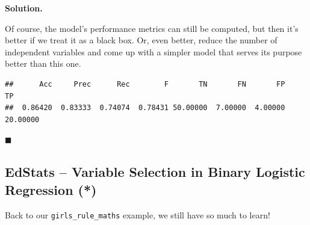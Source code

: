 \documentclass[10pt,b5paper,krantz1]{krantz}
\newenvironment{Shaded}{\begin{snugshade}}{\end{snugshade}}
\newcommand{\DataTypeTok}[1]{\textcolor[rgb]{0.27,0.27,0.27}{#1}}
\newcommand{\FloatTok}[1]{\textcolor[rgb]{0.06,0.06,0.06}{#1}}
\newcommand{\KeywordTok}[1]{\textcolor[rgb]{0.27,0.27,0.27}{\textbf{#1}}}
\newcommand{\NormalTok}[1]{#1}
\newcommand{\OperatorTok}[1]{\textcolor[rgb]{0.43,0.43,0.43}{\textbf{#1}}}
\newcommand{\OtherTok}[1]{\textcolor[rgb]{0.37,0.37,0.37}{#1}}
\newcommand{\StringTok}[1]{\textcolor[rgb]{0.5,0.5,0.5}{#1}}
\newenvironment{solution}{%
\bigskip\noindent\textbf{Solution. }%
\it\ignorespaces%
\ignorespaces%
}{\ignorespaces%
\hfill$\blacksquare$%
}
\begin{document}
\begin{solution}
Of course, the model's performance metrics can still be computed,
but then it's better if we treat it as a black box. Or, even better,
reduce the number of independent variables and come up with a simpler
model that serves its purpose better than this one.

\begin{Shaded}
\end{Shaded}

\begin{verbatim}
##      Acc     Prec      Rec        F       TN       FN       FP       TP 
##  0.86420  0.83333  0.74074  0.78431 50.00000  7.00000  4.00000 20.00000
\end{verbatim}

\end{solution}

\hypertarget{edstats-variable-selection-in-binary-logistic-regression}{%
\subsection{EdStats -- Variable Selection in Binary Logistic Regression (*)}\label{edstats-variable-selection-in-binary-logistic-regression}}

Back to our \texttt{girls\_rule\_maths} example, we still have so much to learn!

\begin{Shaded}
\end{Shaded}
\end{document}
